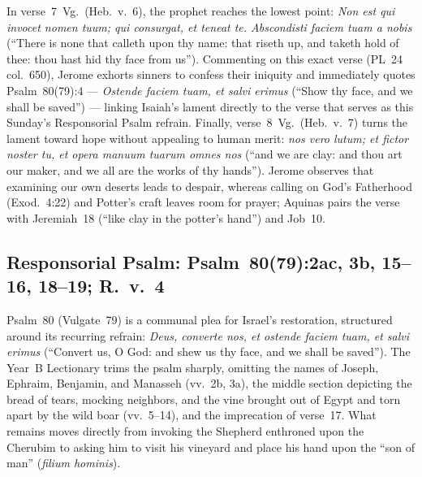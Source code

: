 In verse~7~Vg.\ (Heb.~v.~6), the prophet reaches the lowest point: \emph{Non est qui invocet nomen tuum; qui consurgat, et teneat te. Abscondisti faciem tuam a nobis} (``There is none that calleth upon thy name: that riseth up, and taketh hold of thee: thou hast hid thy face from us''). Commenting on this exact verse (PL~24 col.~650), Jerome exhorts sinners to confess their iniquity and immediately quotes Psalm~80(79):4 --- \emph{Ostende faciem tuam, et salvi erimus} (``Show thy face, and we shall be saved'') --- linking Isaiah's lament directly to the verse that serves as this Sunday's Responsorial Psalm refrain. Finally, verse~8~Vg.\ (Heb.~v.~7) turns the lament toward hope without appealing to human merit: \emph{nos vero lutum; et fictor noster tu, et opera manuum tuarum omnes nos} (``and we are clay: and thou art our maker, and we all are the works of thy hands''). Jerome observes that examining our own deserts leads to despair, whereas calling on God's Fatherhood (Exod.~4:22) and Potter's craft leaves room for prayer; Aquinas pairs the verse with Jeremiah~18 (``like clay in the potter's hand'') and Job~10.

\subsection{Responsorial Psalm: Psalm~80(79):2ac, 3b, 15--16, 18--19; R.~v.~4}

Psalm~80 (Vulgate~79) is a communal plea for Israel's restoration, structured around its recurring refrain: \emph{Deus, converte nos, et ostende faciem tuam, et salvi erimus} (``Convert us, O God: and shew us thy face, and we shall be saved''). The Year~B Lectionary trims the psalm sharply, omitting the names of Joseph, Ephraim, Benjamin, and Manasseh (vv.~2b, 3a), the middle section depicting the bread of tears, mocking neighbors, and the vine brought out of Egypt and torn apart by the wild boar (vv.~5--14), and the imprecation of verse~17. What remains moves directly from invoking the Shepherd enthroned upon the Cherubim to asking him to visit his vineyard and place his hand upon the ``son of man'' (\emph{filium hominis}).

